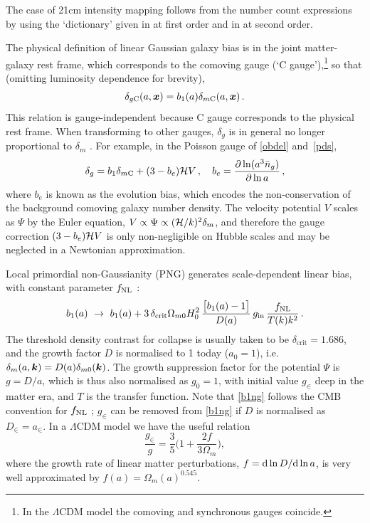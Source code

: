 {{The case of 21cm intensity mapping follows from the number count expressions  by using the `dictionary' given in \cite{Hall:2012wd,Alonso:2015uua,Fonseca:2015laa} at first order and in \cite{Umeh:2015gza,DiDio:2015bua,Jolicoeur:2020eup} at second order.}

The physical definition of linear Gaussian galaxy bias is in the joint matter-galaxy rest frame, which corresponds to the comoving gauge (`C gauge'),\footnote{In the $\Lambda$CDM model  the comoving and synchronous gauges coincide.} so that (omitting luminosity dependence for brevity), 
\begin{equation} \label{b1}
\delta_{g{\mathrm{C}}}(a,\bm {x})=b_1(a)\delta_{m{\mathrm{C}}}(a,\bm {x})\,.
\end{equation}
This relation is gauge-independent because C gauge corresponds to the physical rest frame.
When transforming to other gauges, $\delta_g$ is in general no longer proportional to $\delta_m$ \cite{Challinor:2011bk,Bruni:2011ta,Jeong:2011as}. For example,  in the Poisson gauge of  \eqref{obdel} and~\eqref{pds}, 
\begin{equation} \label{b1pg}
\delta_g =b_1\delta_{m{\mathrm{C}}} + (3-b_e){\cal H}V\,,\quad b_e = \frac{\partial \ln (a^3\bar{n}_g)}{\partial \ln a}\,,
\end{equation}
where $b_e$ is known as the evolution bias, which encodes the non-conservation of the background comoving galaxy number density. The velocity potential $V$ scales as $\Psi$ by the {Euler} equation, $ V\propto  \Psi \propto ({\cal H}/k)^2\delta_m$, and therefore
the gauge correction $(3-b_e){\cal H}V$ is only non-negligible on Hubble scales and may be neglected in a Newtonian approximation. 

Local  primordial non-Gaussianity (PNG) generates scale-dependent linear bias, with constant parameter $f_\text{NL}$ 
\cite{Dalal:2007cu,Matarrese:2008nc}:
\begin{equation} \label{b1ng}
 b_{1}(a)~\to~ b_1(a)+3\,\delta_{\mathrm{crit}}\Omega_{m0}H_0^2 \, \frac{\big[b_1(a)-1 \big]}{D(a)}\, 
 g_{{\mathrm{in}}}\, \frac{f_\text{NL}}{T(k)k^2}\,.
\end{equation}
The threshold density contrast for collapse is usually taken to be $\delta_{\mathrm{crit}}=1.686$, and the growth factor $D$  is normalised to 1 today ($a_0=1$), i.e. $\delta_m(a,\bm {k})=D(a)\delta_{m0}(\bm {k}) $. The growth suppression factor for the potential $\Psi$ is $g=D/a$, which is thus also normalised as $g_0=1$, with initial value $g_{\in}$ deep in the matter era,  and $T$ is the  transfer function. Note that \eqref{b1ng} follows the CMB convention
for $f_\text{NL}$ \cite{Baldauf:2010vn,Desjacques:2016bnm};  $g_{\in}$ can be removed from \eqref{b1ng} if $D$ is normalised as $D_{\in}=a_{\in}$.  
In a $\Lambda$CDM model we have the useful relation \cite{Villa:2015ppa}
\begin{equation} \label{ggin}
\frac{g_{\in}}{g}= \frac{3}{5}\Big(1+ \frac{2f}{3\Omega_m} \Big),
\end{equation}
where the growth rate of linear matter perturbations, $f=\mathrm{d} \ln D/\mathrm{d} \ln a$, is very well approximated by $f(a)=\Omega_m(a)^{0.545}$. 

}
